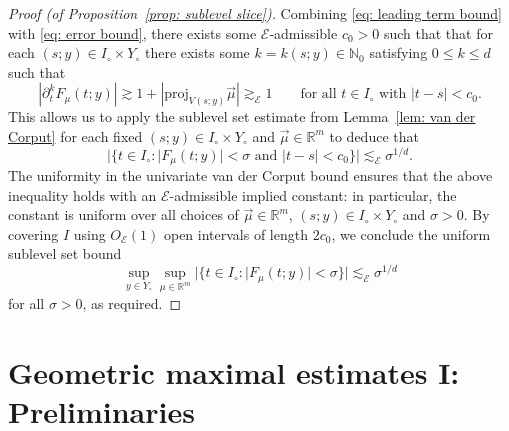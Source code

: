 \documentclass[reqno]{amsart}
\numberwithin{equation}{section}
\newcommand{\N}{\mathbb{N}}
\newcommand{\R}{\mathbb{R}}
\newcommand{\sE}{\mathscr{E}}
\theoremstyle{plain}
\theoremstyle{definition}
\newcommand{\proj}{\mathrm{proj}}
\begin{document}
\begin{proof}[Proof (of Proposition~\ref{prop: sublevel slice})]
Combining \eqref{eq: leading term bound} with \eqref{eq: error bound}, there exists some $\sE$-admissible $c_0 > 0$ such that that for each $(s;y) \in I_{\circ} \times Y_{\circ}$ there exists some $k = k(s;y) \in \N_0$ satisfying $0 \leq k \leq d$ such that
\begin{equation*}
    |\partial_t^k F_{\mu}(t;y)| \gtrsim 1 + |\proj_{V(s;y)}\vec{\mu}| \gtrsim_{\sE} 1 \qquad \textrm{for all $t \in I_{\circ}$ with $|t - s| < c_0$.}
\end{equation*}
This allows us to apply the sublevel set estimate from Lemma~\ref{lem: van der Corput} for each fixed $(s;y) \in I_{\circ} \times Y_{\circ}$ and $\vec{\mu} \in \R^m$ to deduce that
\begin{equation*}
    |\{t \in I_{\circ} : |F_{\mu}(t;y)| < \sigma \textrm{ and } |t-s| < c_0 \}| \lesssim_{\sE} \sigma^{1/d}.
\end{equation*}
The uniformity in the univariate van der Corput bound ensures that the above inequality holds with an $\sE$-admissible implied constant: in particular, the constant is uniform over all choices of $\vec{\mu} \in \R^m$, $(s;y) \in I_{\circ} \times Y_{\circ}$ and $\sigma  > 0$. By covering $I$ using $O_{\sE}(1)$ open intervals of length $2c_0$, we conclude the uniform sublevel set bound
\begin{equation*}
\sup_{y \in Y_{\circ}} \sup_{\mu \in \R^m}   |\{t \in I_{\circ} : |F_{\mu}(t;y)| < \sigma \}| \lesssim_{\sE} \sigma^{1/d}
\end{equation*}
for all $\sigma > 0$, as required.
\end{proof}










\section{Geometric maximal estimates I: Preliminaries} 


\end{document}
